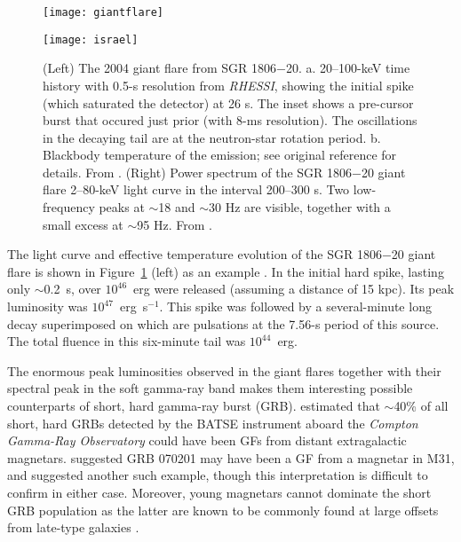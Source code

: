 \begin{figure}
\begin{minipage}{2.9in}
\hspace{-0.3in}
\vspace{0.2in}
\texttt{[image: giantflare]}
\end{minipage}
\hfill
\begin{minipage}{2.9in}
\vspace{0.4in}
\hspace{-0.35in}
\texttt{[image: israel]}
\end{minipage}
\caption{(Left) The 2004 giant flare from SGR 1806$-$20.  a. 20--100-keV time history with 0.5-s resolution
from {\it RHESSI}, showing the initial spike (which saturated the detector) at 26 s.  The inset shows
a pre-cursor burst that occured just prior (with 8-ms resolution).  The oscillations in the decaying tail are at the neutron-star rotation period.  b. Blackbody temperature of the emission; see original
reference for details.  From \citet{hbs+05}.
(Right) Power spectrum of the SGR 1806$-$20 giant flare 2--80-keV light curve in the interval 200--300 s. 
Two low-frequency peaks at $\sim$18 and $\sim$30 Hz are visible, together with a small excess at $\sim$95 Hz.
From \citet{ibs+05}.
}
\label{fig:1806gf}
\end{figure}

The light curve and effective temperature evolution of the SGR
1806$-$20 giant flare is shown in Figure~\ref{fig:1806gf} (left) as an example
\citep[see][for details]{hbs+05}.
In the initial hard spike, lasting only $\sim$0.2~s,
over $10^{46}$~erg were released (assuming
a distance of 15 kpc).  Its peak luminosity was $10^{47}$~erg~s$^{-1}$.
This spike was followed by a several-minute long decay superimposed on
which are pulsations at the 7.56-s period of this source.  The total
fluence in this six-minute tail was $10^{44}$~erg.


The enormous peak luminosities observed in the giant flares together with their spectral
peak in the soft gamma-ray band makes them interesting possible counterparts of short, hard 
gamma-ray burst (GRB).  \citet{hbs+05} estimated that $\sim$40\% of all short, hard GRBs
detected by the BATSE instrument aboard the {\it Compton Gamma-Ray Observatory} could have
been GFs from distant extragalactic magnetars.  \citet{omq+08} suggested GRB 070201 may
have been a GF from a magnetar in M31, and \citet{hrb+10} suggested another such example,
though this interpretation is difficult to confirm in either case.  Moreover, young magnetars
cannot dominate the short GRB population as the latter are known to be commonly found at
large offsets from late-type galaxies \citep{ber14}.

